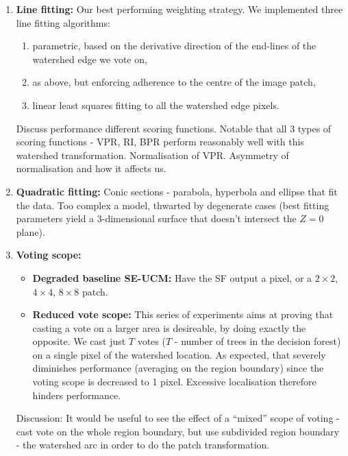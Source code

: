 \begin{enumerate}
\item{\bf Line fitting:}
Our best performing weighting strategy. We implemented three line fitting algorithms:
\begin{enumerate}
  \item parametric, based on the derivative direction of the end-lines of the watershed edge we vote on,
  \item as above, but enforcing adherence to the centre of the image patch,
  \item linear least squares fitting to all the watershed edge pixels.
\end{enumerate}

Discuss performance \wrt different scoring functions. Notable that all 3 types of scoring functions - VPR, RI, BPR perform reasonably well with this watershed transformation. Normalisation of VPR. Asymmetry of normalisation and how it affects us.

\item{\bf Quadratic fitting:} %
Conic sections - parabola, hyperbola and ellipse that fit the data. Too complex a model, thwarted by degenerate cases (best fitting parameters yield a 3-dimensional surface that doesn't intersect the $Z=0$ plane).

\item{\bf Voting scope:}
  \begin{itemize}
    \item{\bf Degraded baseline SE-UCM:} Have the SF output a pixel, or a $2\times2$, $4\times4$, $8\times8$ patch.
    \item{\bf Reduced vote scope:} This series of experiments aims at proving that casting a vote on a larger area is desireable, by doing exactly the opposite. We cast just $T$ votes ($T$ - number of trees in the decision forest) on a single pixel of the watershed location. As expected, that severely diminishes performance (\wrt averaging on the region boundary) since the voting scope is decreased to 1 pixel. Excessive localisation therefore hinders performance.
  \end{itemize}
Discussion: It would be useful to see the effect of a ``mixed'' scope of voting - cast vote on the whole region boundary, but use subdivided region boundary - the watershed arc in order to do the patch transformation.
\end{enumerate}

